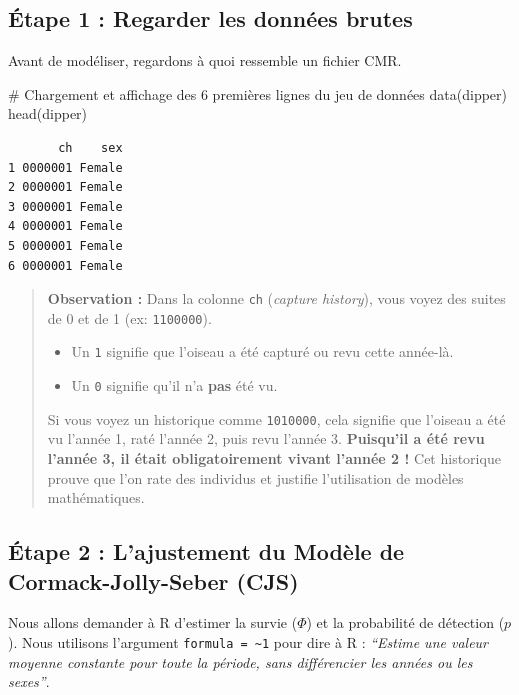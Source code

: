 \documentclass[
  french,
  a4paper,
  DIV=11,
  numbers=noendperiod,
  oneside]{scrreprt}
\newenvironment{Shaded}{}{}
\newcommand{\CommentTok}[1]{\textcolor[rgb]{0.42,0.45,0.49}{#1}}
\newcommand{\FunctionTok}[1]{\textcolor[rgb]{0.44,0.26,0.76}{#1}}
\newcommand{\NormalTok}[1]{\textcolor[rgb]{0.14,0.16,0.18}{#1}}
\begin{document}
\subsection{Étape 1 : Regarder les données
brutes}\label{uxe9tape-1-regarder-les-donnuxe9es-brutes}

Avant de modéliser, regardons à quoi ressemble un fichier CMR.

\begin{Shaded}
\begin{Highlighting}[]
\CommentTok{\# Chargement et affichage des 6 premières lignes du jeu de données}
\FunctionTok{data}\NormalTok{(dipper)}
\FunctionTok{head}\NormalTok{(dipper)}
\end{Highlighting}
\end{Shaded}

\begin{verbatim}
       ch    sex
1 0000001 Female
2 0000001 Female
3 0000001 Female
4 0000001 Female
5 0000001 Female
6 0000001 Female
\end{verbatim}

\begin{quote}
\textbf{Observation :} Dans la colonne \texttt{ch} (\emph{capture
history}), vous voyez des suites de 0 et de 1 (ex: \texttt{1100000}).

\begin{itemize}
\item
  Un \texttt{1} signifie que l'oiseau a été capturé ou revu cette
  année-là.
\item
  Un \texttt{0} signifie qu'il n'a \textbf{pas} été vu.
\end{itemize}

Si vous voyez un historique comme \texttt{1010000}, cela signifie que
l'oiseau a été vu l'année 1, raté l'année 2, puis revu l'année 3.
\textbf{Puisqu'il a été revu l'année 3, il était obligatoirement vivant
l'année 2 !} Cet historique prouve que l'on rate des individus et
justifie l'utilisation de modèles mathématiques.
\end{quote}

\subsection{Étape 2 : L'ajustement du Modèle de Cormack-Jolly-Seber
(CJS)}\label{uxe9tape-2-lajustement-du-moduxe8le-de-cormack-jolly-seber-cjs}

Nous allons demander à R d'estimer la survie (\(\Phi\)) et la
probabilité de détection (\(p\)). Nous utilisons l'argument
\texttt{formula\ =\ \textasciitilde{}1} pour dire à R : \emph{``Estime
une valeur moyenne constante pour toute la période, sans différencier
les années ou les sexes''}.
\end{document}
